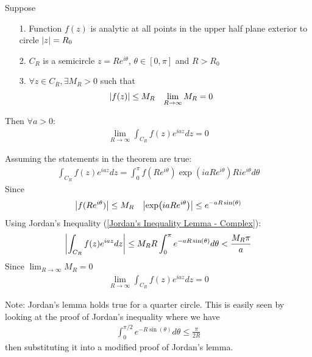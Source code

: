 \documentclass[12pt, english]{book}
\makeatletter
\renewenvironment{proof}[1][\proofname]{\par
	\pushQED{\qed}%
	\normalfont \topsep6\p@\@plus6\p@\relax
	\list{}{%
		\settowidth{\leftmargin}{\itshape\proofname:\hskip\labelsep}%
		\setlength{\labelwidth}{0pt}%
		\setlength{\itemindent}{-\leftmargin}%
		}%
	\item[\hskip\labelsep\itshape#1\@addpunct{:}]\ignorespaces
	}{\popQED\endlist\@endpefalse}
\makeatother
\begin{document}
	\begin{theorem}
		\label{Jordan's Lemma - Complex}
		Suppose
		\begin{itemize}
			\item[1.] Function \(f(z)\) is analytic at all points in the upper half plane exterior to circle \(\abs{z} = R_0\)
			\item[2.] \(C_R\) is a semicircle \(z = Re^{i\theta}\), \(\theta \in [0,\pi]\) and \(R>R_0\)
			\item[3.] \(\forall z \in C_R, \exists M_R > 0\) such that 
			\begin{align*}
				\abs{f(z)} &\leq M_R	&	 \lim_{R \rightarrow \infty} M_R &= 0
			\end{align*}
		\end{itemize}
		Then \(\forall a > 0\):
		\begin{align*}
			\lim_{R \rightarrow \infty} \int_{C_R} f(z) e^{iaz} dz = 0
		\end{align*}
	\end{theorem}
	\begin{proof}
		Assuming the statements in the theorem are true:
		\begin{align*}
			\int_{C_R} f(z) e^{iaz} dz = \int_{0}^{\pi} f(Re^{i\theta}) \exp(iaRe^{i\theta}) Rie^{i\theta} d\theta
		\end{align*}
		Since 
		\begin{align*}
			\abs{f(Re^{i\theta})} &\leq M_R	& \abs{\exp(iaRe^{i\theta})} \leq e^{-aR\sin(\theta)}
		\end{align*}
		Using Jordan's Inequality (\cref{Jordan's Inequality Lemma - Complex}):
		\begin{align*}
			\abs{\int_{C_R} f(z) e^{iaz} dz} \leq M_R R \int_{0}^{\pi} e^{-aR \sin(\theta)} d\theta < \frac{M_R \pi}{a}
		\end{align*}
		Since \( \lim_{R \rightarrow \infty} M_R = 0\)
		\begin{align*}
			\lim_{R \rightarrow \infty} \int_{C_R} f(z) e^{iaz} dz = 0
		\end{align*}
	\end{proof}

	Note: Jordan's lemma holds true for a quarter circle. This is easily seen by looking at the proof of Jordan's inequality where we have 
	\begin{align*}
		\int_{0}^{\pi/2} e^{-R \sin(\theta)} d\theta \leq \frac{\pi}{2R}
	\end{align*}
	then substituting it into a modified proof of Jordan's lemma.
	
\end{document}
